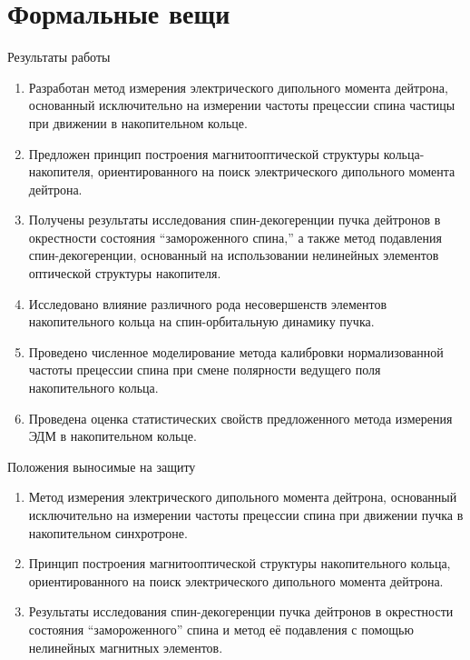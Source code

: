 \documentclass[14pt]{beamer}
\begin{document}
\section{Формальные вещи}
\begin{frame}{Результаты работы}
	\begin{enumerate}
		\item Разработан метод измерения электрического дипольного момента дейтрона, 
		основанный исключительно на измерении частоты прецессии спина частицы 
		при движении в накопительном кольце.
		\item Предложен принцип построения магнитооптической структуры кольца-накопителя, 
		ориентированного на поиск электрического дипольного момента дейтрона.
	\end{enumerate}
\end{frame}
\begin{frame}
	\begin{enumerate}\setcounter{enumi}{2}
		\item Получены результаты исследования спин-декогеренции пучка дейтронов в окрестности 
		состояния ``замороженного спина,'' а также метод подавления спин-декогеренции, основанный на использовании нелинейных элементов оптической структуры накопителя.
		\item Исследовано влияние различного рода несовершенств элементов накопительного кольца 
		на спин-орбитальную динамику пучка.
	\end{enumerate}
\end{frame}
\begin{frame}
	\begin{enumerate}\setcounter{enumi}{4}
		\item Проведено численное моделирование метода калибровки нормализованной частоты прецессии спина 
		при смене полярности ведущего поля накопительного кольца.
		\item Проведена оценка статистических свойств предложенного метода измерения 
		ЭДМ в накопительном кольце.
	\end{enumerate}
\end{frame}
\begin{frame}{Положения выносимые на защиту}
	\begin{enumerate}
		\item Метод измерения электрического дипольного момента дейтрона, основанный исключительно на измерении частоты прецессии спина при движении пучка в накопительном синхротроне.
		\item Принцип построения магнитооптической структуры накопительного кольца, ориентированного на поиск электрического дипольного момента дейтрона.
		\item Результаты исследования спин-декогеренции пучка дейтронов в окрестности состояния ``замороженного'' спина и метод её подавления с помощью нелинейных магнитных элементов.
	\end{enumerate}
\end{frame}
\end{document}
